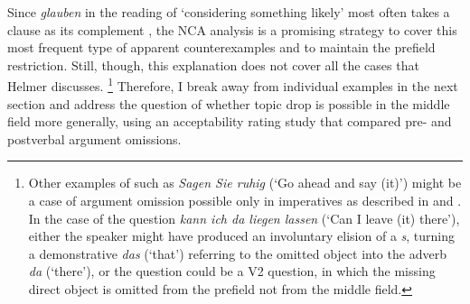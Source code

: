 Since \textit{glauben} in the reading of `considering something likely' most often takes a clause as its complement \citep{glauben}, the NCA analysis is a promising strategy to cover this most frequent type of  apparent counterexamples and to maintain the prefield restriction.
Still, though, this explanation does not cover all the cases that Helmer discusses.%
\footnote{Other examples of \citet{helmer2016} such as \textit{Sagen Sie ruhig} (`Go ahead and say (it)') might be a case of argument omission  possible only in imperatives  as described in \citet{kulpmann.symanczykjoppe2016} and \citet{kulpmann2021}.
In the case of the question \textit{kann ich da liegen lassen} (`Can I leave (it) there'), either the speaker might have produced an involuntary elision of a \textit{s}, turning a demonstrative \textit{das} (`that') referring to the omitted object into the adverb \textit{da} (`there'), or the question could be a V2 question, in which the missing direct object is omitted from the prefield not from the middle field.}
%
Therefore, I break away from  individual examples in the next section and address the question of whether topic drop is possible in the middle field more generally, using an acceptability rating study that compared pre- and postverbal argument omissions.  

\label{exp:pf.mf}
